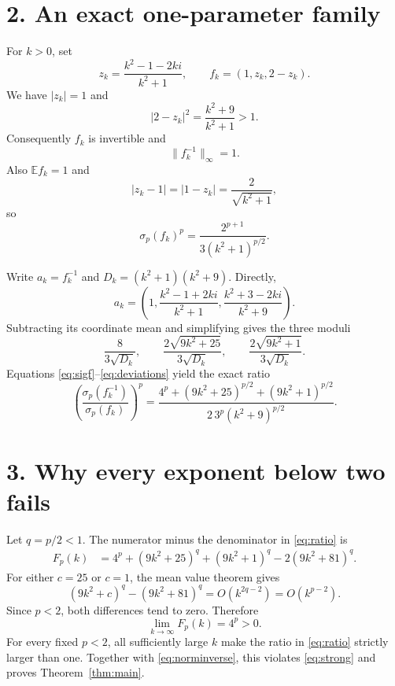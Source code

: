 \documentclass[10pt,a4paper]{article}
\newcommand{\E}{\mathbb E}
\newcommand{\sig}{\sigma}
\begin{document}
\section*{2. An exact one-parameter family}

For $k>0$, set
\[
 z_k=\frac{k^2-1-2ki}{k^2+1},
 \qquad f_k=(1,z_k,2-z_k).
\]
We have $|z_k|=1$ and
\[
 |2-z_k|^2=\frac{k^2+9}{k^2+1}>1.
\]
Consequently $f_k$ is invertible and
\begin{equation}\label{eq:norminverse}
 \|f_k^{-1}\|_\infty=1.
\end{equation}
Also $\E f_k=1$ and
\[
 |z_k-1|=|1-z_k|=\frac{2}{\sqrt{k^2+1}},
\]
so
\begin{equation}\label{eq:sigf}
 \sig_p(f_k)^p=\frac{2^{p+1}}{3(k^2+1)^{p/2}}.
\end{equation}

Write $a_k=f_k^{-1}$ and $D_k=(k^2+1)(k^2+9)$.  Directly,
\[
 a_k=\left(
 1,\frac{k^2-1+2ki}{k^2+1},
 \frac{k^2+3-2ki}{k^2+9}\right).
\]
Subtracting its coordinate mean and simplifying gives the three moduli
\begin{equation}\label{eq:deviations}
 \frac{8}{3\sqrt{D_k}},\qquad
 \frac{2\sqrt{9k^2+25}}{3\sqrt{D_k}},\qquad
 \frac{2\sqrt{9k^2+1}}{3\sqrt{D_k}}.
\end{equation}
Equations \eqref{eq:sigf}--\eqref{eq:deviations} yield the exact ratio
\begin{equation}\label{eq:ratio}
 \left(\frac{\sig_p(f_k^{-1})}{\sig_p(f_k)}\right)^p
 =
 \frac{4^p+(9k^2+25)^{p/2}+(9k^2+1)^{p/2}}
 {2\,3^p(k^2+9)^{p/2}}.
\end{equation}

\section*{3. Why every exponent below two fails}

Let $q=p/2<1$.  The numerator minus the denominator in
\eqref{eq:ratio} is
\begin{align}
 F_p(k)
 &=4^p+(9k^2+25)^q+(9k^2+1)^q
       -2(9k^2+81)^q.\label{eq:F}
\end{align}
For either $c=25$ or $c=1$, the mean value theorem gives
\[
 (9k^2+c)^q-(9k^2+81)^q=O(k^{2q-2})=O(k^{p-2}).
\]
Since $p<2$, both differences tend to zero.  Therefore
\[
 \lim_{k\to\infty}F_p(k)=4^p>0.
\]
For every fixed $p<2$, all sufficiently large $k$ make the ratio in
\eqref{eq:ratio} strictly larger than one.  Together with
\eqref{eq:norminverse}, this violates \eqref{eq:strong} and proves
Theorem~\ref{thm:main}.
\end{document}

